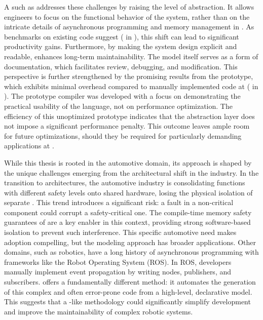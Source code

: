 A \dsl such as \GRust addresses these challenges by raising the level of abstraction. It allows
engineers to focus on the functional behavior of the system, rather than on the intricate details of
asynchronous programming and memory management in \Rust. As benchmarks on existing \ampere code
suggest ( in ), this shift can lead to significant productivity
gains. Furthermore, by making the system design explicit and readable, \GRust enhances long-term
maintainability. The model itself serves as a form of documentation, which facilitates review,
debugging, and modification.
%
This perspective is further strengthened by the promising results from the \GRust prototype, which
exhibits minimal overhead compared to manually implemented code at \ampere
( in ). The prototype compiler was developed with a focus on
demonstrating the practical usability of the language, not on performance optimization. The
efficiency of this unoptimized prototype indicates that the abstraction layer does not impose a
significant performance penalty. This outcome leaves ample room for future optimizations, should
they be required for particularly demanding applications at \ampere.

While this thesis is rooted in the automotive domain, its approach is shaped by the unique
challenges emerging from the architectural shift in the industry. In the transition to \sdv
architectures, the automotive industry is consolidating functions with different safety levels onto
shared hardware, losing the physical isolation of separate \ecus. This trend introduces a
significant risk: a fault in a non-critical component could corrupt a safety-critical one.
The compile-time memory safety guarantees of \Rust are a key enabler in this context, providing
strong software-based isolation to prevent such interference.
%
This specific automotive need makes \Rust adoption compelling, but the \GRust modeling approach has
broader applications. Other domains, such as robotics, have a long history of asynchronous
programming with frameworks like the Robot Operating System (ROS). In ROS, developers manually
implement event propagation by writing nodes, publishers, and subscribers. \GRust offers a
fundamentally different method: it automates the generation of this complex and often error-prone
code from a high-level, declarative model. This suggests that a \GRust-like methodology could
significantly simplify development and improve the maintainability of complex robotic systems.


